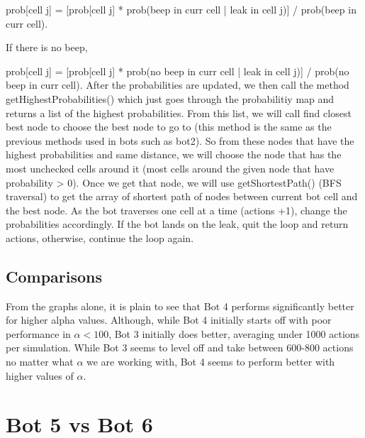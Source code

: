 \documentclass[12pt]{article}
\begin{document}
prob[cell j] = [prob[cell j] * prob(beep in curr cell | leak in cell j)] / prob(beep in curr cell).  

If there is no beep,  

prob[cell j] = [prob[cell j] * prob(no beep in curr cell | leak in cell j)] / prob(no beep in curr cell). 
After the probabilities are updated, we then call the method getHighestProbabilities() 
which just goes through the probabilitiy map and returns a list of the highest probabilities. 
From this list, we will call find closest best node to choose the best node to go to 
(this method is the same as the previous methods used in bots such as bot2). So from these 
nodes that have the highest probabilities and same distance, we will choose the node that has 
the most unchecked cells around it (most cells around the given node that have probability > 0). 
Once we get that node, we will use getShortestPath() (BFS traversal) to get the array of shortest 
path of nodes between current bot cell and the best node. As the bot traverses one cell at a time 
(actions +1), change the probabilities accordingly. If the bot lands on the leak, quit the loop 
and return actions, otherwise, continue the loop again. 

\subsection*{Comparisons}
From the graphs alone, it is plain to see that Bot 4 performs significantly better for higher alpha values. Although, 
while Bot 4 initially starts off with poor performance in $\alpha < 100$, Bot 3 initially does better, averaging 
under 1000 actions per simulation. While Bot 3 seems to level off and take between 600-800 actions no matter what 
$\alpha$ we are working with, Bot 4 seems to perform better with higher values of $\alpha$.    

\section*{Bot 5 vs Bot 6}
\end{document}

